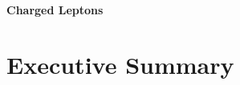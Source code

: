 %

%
\begin{center}
{\Huge\bf Charged Leptons}
\end{center}


\begin{center}\begin{boldmath}






\end{boldmath}\end{center}

\makeatletter
\renewcommand{\paragraph}{\@startsection{paragraph}{4}{0ex}%
   {-3.25ex plus -1ex minus -0.2ex}%
   {1.5ex plus 0.2ex}%
   {\normalfont\normalsize\bfseries}}
\makeatother



\tableofcontents

\chapter{Executive Summary}\label{sec:cl:execsum}
\medskip



